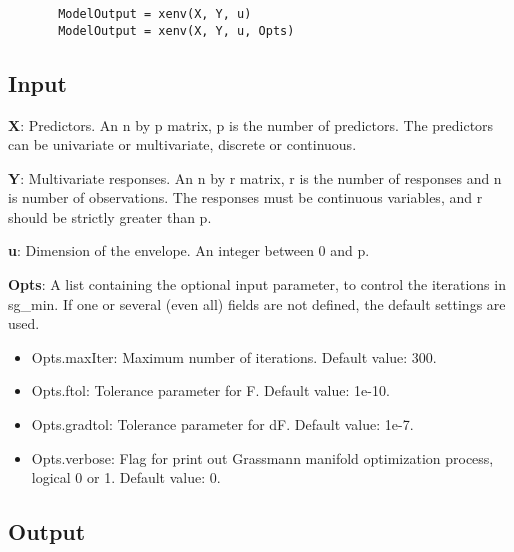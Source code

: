 \documentclass[a4paper,11pt,openany]{memoir}
\begin{document}
\begin{verbatim}       ModelOutput = xenv(X, Y, u)
       ModelOutput = xenv(X, Y, u, Opts)\end{verbatim}
    

\subsection*{Input}

\begin{par}
\textbf{X}: Predictors. An n by p matrix, p is the number of predictors. The predictors can be univariate or multivariate, discrete or continuous.
\end{par} \vspace{1em}
\begin{par}
\textbf{Y}: Multivariate responses. An n by r matrix, r is the number of responses and n is number of observations. The responses must be continuous variables, and r should be strictly greater than p.
\end{par} \vspace{1em}
\begin{par}
\textbf{u}: Dimension of the envelope. An integer between 0 and p.
\end{par} \vspace{1em}
\begin{par}
\textbf{Opts}: A list containing the optional input parameter, to control the iterations in sg\_min. If one or several (even all) fields are not defined, the default settings are used.
\end{par} \vspace{1em}
\begin{itemize}
\setlength{\itemsep}{-1ex}
   \item Opts.maxIter: Maximum number of iterations.  Default value: 300.
   \item Opts.ftol: Tolerance parameter for F.  Default value: 1e-10.
   \item Opts.gradtol: Tolerance parameter for dF.  Default value: 1e-7.
   \item Opts.verbose: Flag for print out Grassmann manifold optimization process, logical 0 or 1. Default value: 0.
\end{itemize}


\subsection*{Output}
\end{document}
